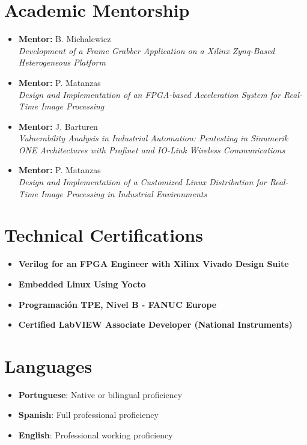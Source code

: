 \documentclass[11pt,a4paper]{article}
\begin{document}
\section{Academic Mentorship}
\begin{itemize}
    \item \textbf{Mentor:} B. Michalewicz \\
    \textit{Development of a Frame Grabber Application on a Xilinx Zynq-Based Heterogeneous Platform}
    
    \item \textbf{Mentor:} P. Matanzas \\
    \textit{Design and Implementation of an FPGA-based Acceleration System for Real-Time Image Processing}
    
    \item \textbf{Mentor:} J. Barturen \\
    \textit{Vulnerability Analysis in Industrial Automation: Pentesting in Sinumerik ONE Architectures with Profinet and IO-Link Wireless Communications}
    
    \item \textbf{Mentor:} P. Matanzas \\
    \textit{Design and Implementation of a Customized Linux Distribution for Real-Time Image Processing in Industrial Environments}
\end{itemize}

\section{Technical Certifications}
\begin{itemize}
    \item \textbf{Verilog for an FPGA Engineer with Xilinx Vivado Design Suite}
    \item \textbf{Embedded Linux Using Yocto}
    \item \textbf{Programación TPE, Nivel B - FANUC Europe}
    \item \textbf{Certified LabVIEW Associate Developer (National Instruments)}
\end{itemize}

\section{Languages}
\begin{itemize}
    \item \textbf{Portuguese}: Native or bilingual proficiency
    \item \textbf{Spanish}: Full professional proficiency
    \item \textbf{English}: Professional working proficiency
\end{itemize}
\end{document}
